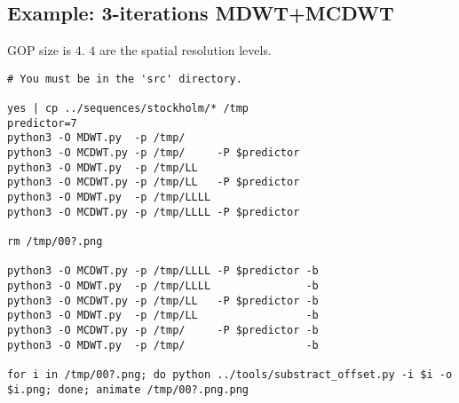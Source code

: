 \subsection*{Example: 3-iterations MDWT+MCDWT}
GOP size is $4$. $4$ are the spatial resolution levels.
\begin{verbatim}
# You must be in the 'src' directory.

yes | cp ../sequences/stockholm/* /tmp
predictor=7
python3 -O MDWT.py  -p /tmp/
python3 -O MCDWT.py -p /tmp/     -P $predictor
python3 -O MDWT.py  -p /tmp/LL
python3 -O MCDWT.py -p /tmp/LL   -P $predictor
python3 -O MDWT.py  -p /tmp/LLLL
python3 -O MCDWT.py -p /tmp/LLLL -P $predictor

rm /tmp/00?.png

python3 -O MCDWT.py -p /tmp/LLLL -P $predictor -b
python3 -O MDWT.py  -p /tmp/LLLL               -b
python3 -O MCDWT.py -p /tmp/LL   -P $predictor -b
python3 -O MDWT.py  -p /tmp/LL                 -b
python3 -O MCDWT.py -p /tmp/     -P $predictor -b
python3 -O MDWT.py  -p /tmp/                   -b

for i in /tmp/00?.png; do python ../tools/substract_offset.py -i $i -o $i.png; done; animate /tmp/00?.png.png
\end{verbatim}


